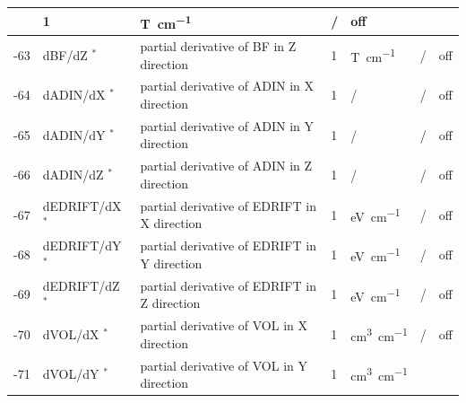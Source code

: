 \begin{landscape}
\begin{longtable}{|r|l|l|l|l|c|c|}
                           & 1                            & \si{\tesla\per\centi\metre}
			   & /              & off
    \\ \hline
    -63                    & dBF/dZ $^*$
                           & partial derivative of BF in Z direction
                           & 1                            & \si{\tesla\per\centi\metre}
			   & /              & off
    \\ \hline
    -64                    & dADIN/dX $^*$
                           & partial derivative of ADIN in X direction
                           & 1                            & /
			   & /              & off
    \\ \hline
    -65                    & dADIN/dY $^*$
                           & partial derivative of ADIN in Y direction
                           & 1                            & /
			   & /              & off
    \\ \hline
    -66                    & dADIN/dZ $^*$
                           & partial derivative of ADIN in Z direction
                           & 1                            & /
			   & /              & off
    \\ \hline
    -67                    & dEDRIFT/dX $^*$
                           & partial derivative of EDRIFT in X direction
                           & 1                            & \si{\electronvolt\per\centi\meter}
			   & /              & off
    \\ \hline
    -68                    & dEDRIFT/dY $^*$
                           & partial derivative of EDRIFT in Y direction
                           & 1                            & \si{\electronvolt\per\centi\meter}
			   & /              & off
    \\ \hline
    -69                    & dEDRIFT/dZ $^*$
                           & partial derivative of EDRIFT in Z direction
                           & 1                            & \si{\electronvolt\per\centi\meter}
			   & /              & off
    \\ \hline
    -70                    & dVOL/dX $^*$
                           & partial derivative of VOL in X direction
                           & 1                            & \si{\cubic\centi\metre\per\centi\metre}
			   & /              & off
    \\ \hline
    -71                    & dVOL/dY $^*$
                           & partial derivative of VOL in Y direction
                           & 1                            & \si{\cubic\centi\metre\per\centi\metre}

\end{longtable}
\end{landscape}
